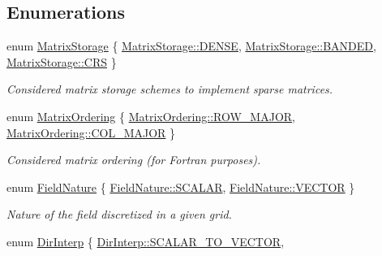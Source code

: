 \subsection*{Enumerations}
\begin{DoxyCompactItemize}
\item 
enum \hyperlink{group__c02-enums_ga25b67ec6a2afeee69f9bb196a9c66619}{Matrix\+Storage} \{ \hyperlink{group__c02-enums_ga25b67ec6a2afeee69f9bb196a9c66619a0706fbbd929bd8abc4de386c53d439ff}{Matrix\+Storage\+::\+D\+E\+N\+S\+E}, 
\hyperlink{group__c02-enums_ga25b67ec6a2afeee69f9bb196a9c66619a710800eb2f07821684373493be7fee14}{Matrix\+Storage\+::\+B\+A\+N\+D\+E\+D}, 
\hyperlink{group__c02-enums_ga25b67ec6a2afeee69f9bb196a9c66619a22d51ee0c812123c541f2a1bdf794fd1}{Matrix\+Storage\+::\+C\+R\+S}
 \}
\begin{DoxyCompactList}\small\item\em Considered matrix storage schemes to implement sparse matrices. \end{DoxyCompactList}\item 
enum \hyperlink{group__c02-enums_ga622801bd9f912d0f976c3e383f5f581c}{Matrix\+Ordering} \{ \hyperlink{group__c02-enums_ga622801bd9f912d0f976c3e383f5f581ca21541962976d7709c26e9cd8385bd648}{Matrix\+Ordering\+::\+R\+O\+W\+\_\+\+M\+A\+J\+O\+R}, 
\hyperlink{group__c02-enums_ga622801bd9f912d0f976c3e383f5f581ca34d2765ffc490951febdcca04bc4f7cd}{Matrix\+Ordering\+::\+C\+O\+L\+\_\+\+M\+A\+J\+O\+R}
 \}
\begin{DoxyCompactList}\small\item\em Considered matrix ordering (for Fortran purposes). \end{DoxyCompactList}\item 
enum \hyperlink{group__c02-enums_ga4c54f2a329cfb4e56213b02a259d19e2}{Field\+Nature} \{ \hyperlink{group__c02-enums_ga4c54f2a329cfb4e56213b02a259d19e2a8f3d9a4b6a7b7f2c7afa61ca113d0db9}{Field\+Nature\+::\+S\+C\+A\+L\+A\+R}, 
\hyperlink{group__c02-enums_ga4c54f2a329cfb4e56213b02a259d19e2a87752381b583740610f1dfeb07fdad7e}{Field\+Nature\+::\+V\+E\+C\+T\+O\+R}
 \}
\begin{DoxyCompactList}\small\item\em Nature of the field discretized in a given grid. \end{DoxyCompactList}\item 
enum \hyperlink{group__c02-enums_ga674ec67bd1baa04e5dc06c2bcc351972}{Dir\+Interp} \{ \hyperlink{group__c02-enums_ga674ec67bd1baa04e5dc06c2bcc351972a53facfbeb6725b2bd220c8d9811a0673}{Dir\+Interp\+::\+S\+C\+A\+L\+A\+R\+\_\+\+T\+O\+\_\+\+V\+E\+C\+T\+O\+R}, 

\end{DoxyCompactItemize}
